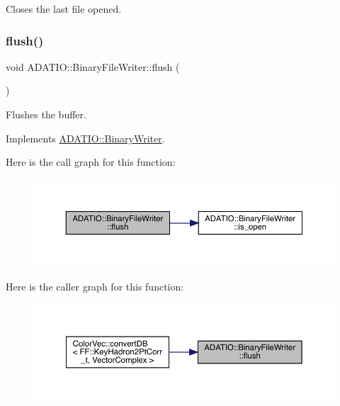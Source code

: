 Closes the last file opened. 

\mbox{\label{classADATIO_1_1BinaryFileWriter_ad914b901c6386a2ad7b2c8cf9bddfa9b}} 
\subsubsection{\texorpdfstring{flush()}{flush()}\hspace{0.1cm}{\footnotesize\ttfamily [1/2]}}
{\footnotesize\ttfamily void A\+D\+A\+T\+I\+O\+::\+Binary\+File\+Writer\+::flush (\begin{DoxyParamCaption}{ }\end{DoxyParamCaption})\hspace{0.3cm}{\ttfamily [virtual]}}



Flushes the buffer. 



Implements \mbox{\hyperlink{classADATIO_1_1BinaryWriter_a1d335eeed64094b8641f3ebf731c981e}{A\+D\+A\+T\+I\+O\+::\+Binary\+Writer}}.

Here is the call graph for this function\+:\nopagebreak
\begin{figure}[H]
\begin{center}
\leavevmode
\includegraphics[width=350pt]{dc/d11/classADATIO_1_1BinaryFileWriter_ad914b901c6386a2ad7b2c8cf9bddfa9b_cgraph}
\end{center}
\end{figure}
Here is the caller graph for this function\+:\nopagebreak
\begin{figure}[H]
\begin{center}
\leavevmode
\includegraphics[width=350pt]{dc/d11/classADATIO_1_1BinaryFileWriter_ad914b901c6386a2ad7b2c8cf9bddfa9b_icgraph}
\end{center}
\end{figure}
\mbox{\label{classADATIO_1_1BinaryFileWriter_ad914b901c6386a2ad7b2c8cf9bddfa9b}} 
